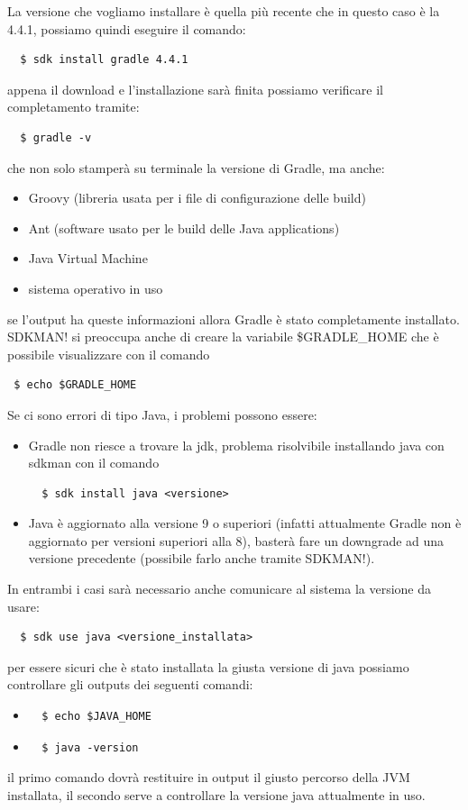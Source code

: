 \documentclass{article}
\begin{document}
\begin{flushleft}
La versione che vogliamo installare è quella più recente che in questo caso è la 4.4.1, possiamo quindi eseguire il comando:
\begin{verbatim}
  $ sdk install gradle 4.4.1
\end{verbatim}
appena il download e l'installazione sarà finita possiamo verificare il completamento tramite:
\begin{verbatim}
  $ gradle -v
\end{verbatim}
che non solo stamperà su terminale la versione di Gradle, ma anche:
\begin{itemize}
  \item Groovy (libreria usata per i file di configurazione delle build)
  \item Ant (software usato per le build delle Java applications)
  \item Java Virtual Machine
  \item sistema operativo in uso
\end{itemize}
se l'output ha queste informazioni allora Gradle è stato completamente installato. SDKMAN! si preoccupa anche di creare la variabile \$GRADLE\_HOME che è possibile visualizzare con il comando \begin{verbatim} $ echo $GRADLE_HOME \end{verbatim} Se ci sono errori di tipo Java, i problemi possono essere:
\begin{itemize}
  \item Gradle non riesce a trovare la jdk, problema risolvibile installando java con sdkman con il comando \begin{verbatim}  $ sdk install java <versione> \end{verbatim}
  \item Java è aggiornato alla versione 9 o superiori (infatti attualmente Gradle non è aggiornato per versioni superiori alla 8), basterà fare un downgrade ad una versione precedente (possibile farlo anche tramite SDKMAN!).
\end{itemize}
In entrambi i casi sarà necessario anche comunicare al sistema la versione da usare: \begin{verbatim}  $ sdk use java <versione_installata> \end{verbatim} per essere sicuri che è stato installata la giusta versione di java possiamo controllare gli outputs dei seguenti comandi:
\begin{itemize}
  \item \begin{verbatim}  $ echo $JAVA_HOME \end{verbatim}
  \item \begin{verbatim}  $ java -version \end{verbatim}
\end{itemize}
il primo comando dovrà restituire in output il giusto percorso della JVM installata, il secondo serve a controllare la versione java attualmente in uso.



\end{flushleft}
\end{document}
